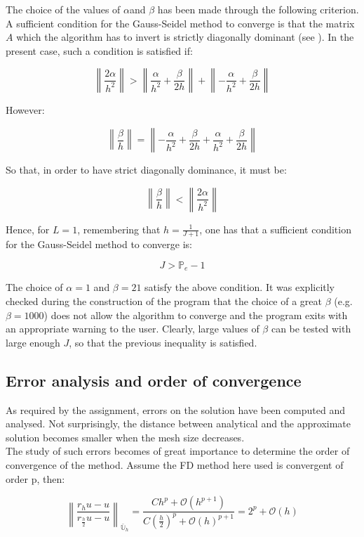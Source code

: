 \documentclass[11pt]{article}
\theoremstyle{theorem}
\theoremstyle{definition}
\begin{document}
The choice of the values of $\alpha$and $\beta$ has been made through the following criterion.\\
A sufficient condition for the Gauss-Seidel method to converge is that the matrix $A$ which the algorithm has to invert is strictly diagonally dominant (see \cite{numerical-math}). In the present case, such a condition is satisfied if:

$$\left\|\frac{2\alpha}{h^2}\right\|> \left\|\frac{\alpha}{h^2}+\frac{\beta}{2h}\right\| + \left\|-\frac{\alpha}{h^2}+\frac{\beta}{2h}\right\|$$

However:

$$\left\|\frac{\beta}{h}\right\|= \left\|-\frac{\alpha}{h^2}+\frac{\beta}{2h}+\frac{\alpha}{h^2}+\frac{\beta}{2h}\right\|$$

So that, in order to have strict diagonally dominance, it must be:

$$\left\|\frac{\beta}{h}\right\|<\left\|\frac{2\alpha}{h^2}\right\|$$

Hence, for $L=1$, remembering that $h=\frac{1}{J+1}$, one has that a sufficient condition for the Gauss-Seidel method to converge is:

$$J>\mathbb{P}_e-1$$

The choice of $\alpha=1$ and $\beta=21$ satisfy the above condition. It was explicitly checked during the construction of the program that the choice of a great $\beta$ (e.g. $\beta=1000$) does not allow the algorithm to converge and the program exits with an appropriate warning to the user. Clearly, large values of $\beta$ can be tested with large enough $J$, so that the previous inequality is satisfied.\\

\subsection{Error analysis and order of convergence}
As required by the assignment, errors on the solution have been computed and analysed. Not surprisingly, the distance between analytical and the approximate solution becomes smaller when the mesh size decreases.\\
The study of such errors becomes of great importance to determine the order of convergence of the method. Assume the FD method here used is convergent of order p, then:

$$\left\|\frac{r_hu-u}{r_{\frac{h}{2}}u-u}\right\|_{\bar{\mathbb{U}}_h}=\frac{Ch^p+\mathcal{O}(h^{p+1})}{C\left(\frac{h}{2}\right)^p+\mathcal{O}(h)^{p+1}}= 2^p+\mathcal{O}(h)$$
\end{document}

